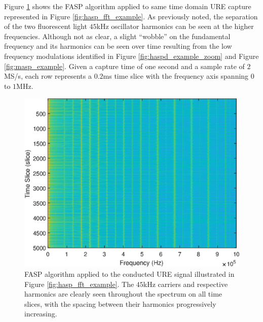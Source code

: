 Figure \ref{fig:fasp_example} shows the FASP algorithm applied to same time domain URE capture represented in Figure \ref{fig:hasp_fft_example}.  As previously noted, the separation of the two fluorescent light $45$kHz oscillator harmonics can be seen at the higher frequencies.   Although not as clear, a slight ``wobble'' on the fundamental frequency and its harmonics can be seen over time resulting from the low frequency modulations identified in Figure \ref{fig:haspd_example_zoom} and Figure \ref{fig:masp_example}.  Given a capture time of one second and a sample rate of $2$MS/s, each row represents a $0.2$ms time slice with the frequency axis spanning $0$ to $1$MHz.
 
\begin{figure}[tp]
	\includegraphics[width=\textwidth]{./dasp_algorithm_results/fasp_filenum_9601.eps}
	\centering
	\caption{FASP algorithm applied to the conducted URE signal illustrated in Figure \ref{fig:hasp_fft_example}.  The $45$kHz carriers and respective harmonics are clearly seen throughout the spectrum on all time slices, with the spacing between their harmonics progressively increasing.}
	\label{fig:fasp_example}
\end{figure}
